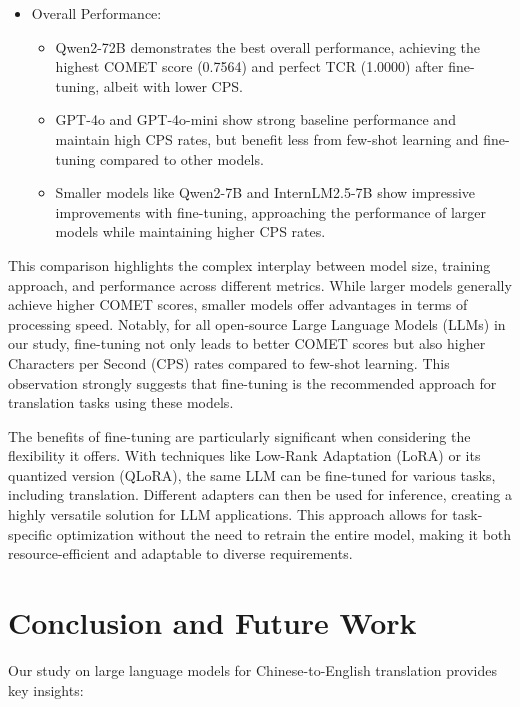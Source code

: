 \documentclass[conference]{IEEEtran}
\begin{document}
\begin{itemize}
    \item Overall Performance:
    \begin{itemize}
        \item Qwen2-72B demonstrates the best overall performance, achieving the highest COMET score (0.7564) and perfect TCR (1.0000) after fine-tuning, albeit with lower CPS.
        \item GPT-4o and GPT-4o-mini show strong baseline performance and maintain high CPS rates, but benefit less from few-shot learning and fine-tuning compared to other models.
        \item Smaller models like Qwen2-7B and InternLM2.5-7B show impressive improvements with fine-tuning, approaching the performance of larger models while maintaining higher CPS rates.
    \end{itemize}
\end{itemize}

This comparison highlights the complex interplay between model size, training approach, and performance across different metrics. While larger models generally achieve higher COMET scores, smaller models offer advantages in terms of processing speed. Notably, for all open-source Large Language Models (LLMs) in our study, fine-tuning not only leads to better COMET scores but also higher Characters per Second (CPS) rates compared to few-shot learning. This observation strongly suggests that fine-tuning is the recommended approach for translation tasks using these models.

The benefits of fine-tuning are particularly significant when considering the flexibility it offers. With techniques like Low-Rank Adaptation (LoRA) or its quantized version (QLoRA), the same LLM can be fine-tuned for various tasks, including translation. Different adapters can then be used for inference, creating a highly versatile solution for LLM applications. This approach allows for task-specific optimization without the need to retrain the entire model, making it both resource-efficient and adaptable to diverse requirements.

\section{Conclusion and Future Work}

Our study on large language models for Chinese-to-English translation provides key insights:
\end{document}

